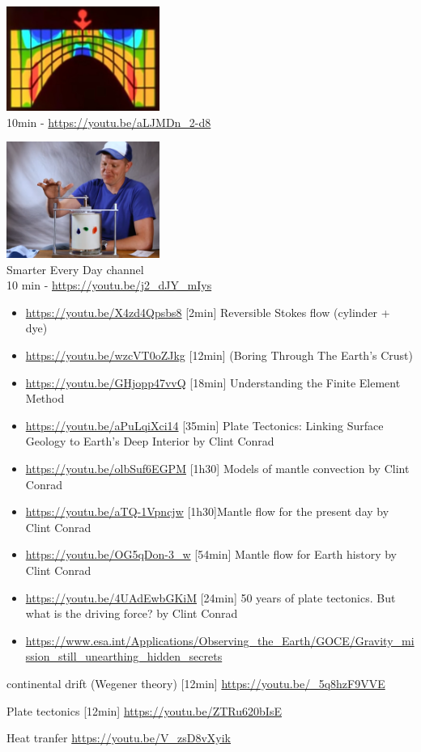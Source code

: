 
\begin{center}
\includegraphics[width=5cm]{images/youtube/superold}\\
10min - \url{https://youtu.be/aLJMDn_2-d8}
\end{center}

\begin{center}
\includegraphics[width=5cm]{images/youtube/smarter}\\
Smarter Every Day channel\\
10 min - \url{https://youtu.be/j2_dJY_mIys}
\end{center}


\begin{itemize}
\item \url{https://youtu.be/X4zd4Qpsbs8} [2min] Reversible Stokes flow (cylinder + dye)
\item \url{https://youtu.be/wzcVT0oZJkg} [12min] (Boring Through The Earth's Crust)
\item \url{https://youtu.be/GHjopp47vvQ} [18min] Understanding the Finite Element Method
\item \url{https://youtu.be/aPuLqiXci14} [35min] Plate Tectonics: Linking Surface Geology to Earth’s Deep Interior by Clint Conrad 
\item \url{https://youtu.be/olbSuf6EGPM} [1h30] Models of mantle convection by Clint Conrad 
\item \url{https://youtu.be/aTQ-1Vpncjw} [1h30]Mantle flow for the present day by Clint Conrad 
\item \url{https://youtu.be/OG5qDon-3_w} [54min] Mantle flow for Earth history by Clint Conrad 
\item \url{https://youtu.be/4UAdEwbGKiM} [24min] 50 years of plate tectonics. But what is the driving force? by Clint Conrad
\item \url{https://www.esa.int/Applications/Observing_the_Earth/GOCE/Gravity_mission_still_unearthing_hidden_secrets}
\end{itemize}


continental drift (Wegener theory) [12min] \url{https://youtu.be/_5q8hzF9VVE}

Plate tectonics [12min]  \url{https://youtu.be/ZTRu620bIsE}

Heat tranfer \url{https://youtu.be/V_zsD8vXyik}
